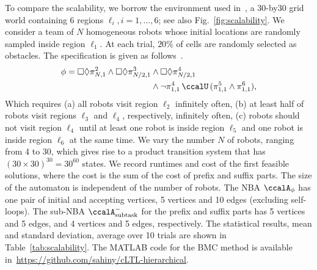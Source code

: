 \documentclass[Afour,sageh,times]{sagej}
\newcommand{\auto}[1]{\ccalA_{\textup{#1}}}
\newcommand{\autop}{\ccalA_{\phi}}
\renewcommand{\ap}[3]{\mathcal{\pi}_{{#1},{#2}}^{#3}}
\begin{document}
{To compare the scalability, we borrow the environment used in~\cite{sahin2019multi}, a 30-by30 grid world containing 6 regions $\ell_i, i=1,\ldots,6$; see also Fig.~\ref{fig:scalability}. We consider a team of $N$ homogeneous robots whose initial locations are randomly sampled inside region $\ell_1$. At each trial, $20\%$ of cells are randomly selected as obstacles. The specification is given as follows~\cite{sahin2019multi}.
\begin{align*}
  \phi =   \square \Diamond \ap{N}{1}{2} \wedge \square \Diamond \ap{N/2}{1}{3} & \wedge \square \Diamond \ap{N/2}{1}{4} \\
  & \wedge \neg \ap{1}{1}{4} \,\ccalU\, (\ap{1}{1}{5} \wedge \ap{1}{1}{6}),
\end{align*}
Which requires (a) all robots visit region $\ell_2$ infinitely often, (b) at least half of robots visit regions $\ell_3$ and $\ell_4$, respectively, infinitely often, (c) robots should not visit region $\ell_4$ until at least one robot is inside region $\ell_5$ and one robot is inside region $\ell_6$ at the same time. We vary the number $N$ of robots, ranging from 4 to 30, which gives rise to a product transition system that has $(30\times30)^{30}=30^{60}$ states. We record runtimes  and cost of the first feasible solutions, where the cost is the sum of the cost of prefix and suffix parts. %
The size of the automaton is independent of the number of robots. The NBA $\autop$ has one pair of initial and accepting vertices, 5 vertices and 10 edges (excluding self-loops). The sub-NBA $\auto{subtask}^-$ for the prefix and suffix  parts has 5 vertices and 5 edges, and 4 vertices and 5 edges, respectively.  The statistical results, mean and standard deviation, average over 10 trials are shown in Table~\ref{tab:scalability}. The MATLAB code for the BMC method is available in~\url{https://github.com/sahiny/cLTL-hierarchical}.
\begin{table}[!t]
  \caption{Results with respect to the number of robots}\label{tab:scalability}
  \centering
\end{table}

}
\end{document}
